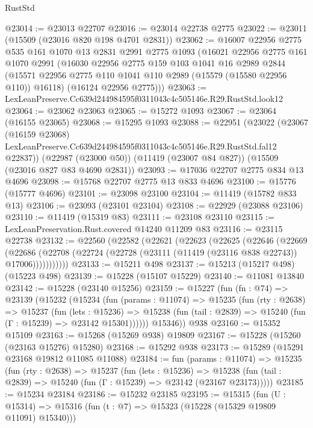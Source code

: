 \begin{lexlean}{RustStd}
\begin{coremodule}
@23014 := @23013 @22707
@23016 := @23014 @22738 @2775
@23022 := @23011 (@15509 (@23016 @820 @198 @4701 @2831))
@23062 := @16007
    @22956
    @2775
    @535
    @161
    @1070
    @13
    @2831
    @2991
    @2775
    @1093
    (@16021
      @22956
      @2775
      @161
      @1070
      @2991
      (@16030
        @22956
        @2775
        @159
        @103
        @1041
        @16
        @2989
        @2844
        (@15571 @22956 @2775 @110 @1041 @110 @2989 (@15579 (@15580 @22956 @110)) @16118)
        (@16124 @22956 @2775)))
@23063 := LexLeanPreserve.Cc639d244984595f0311043c4c505146e.R29.RustStd.look12
@23064 := @23062 @23063
@23065 := @15272 @1093
@23067 := @23064 (@16155 @23065)
@23068 := @15295 @1093
@23088 := @22951
    (@23022
      (@23067
        (@16159 @23068)
        LexLeanPreserve.Cc639d244984595f0311043c4c505146e.R29.RustStd.fal12
        @22837))
    (@22987 (@23000 @50))
    (@11419 (@23007 @84 @827))
    (@15509 (@23016 @827 @83 @4690 @2831))
@23093 := @17036 @22707 @2775 @834 @13 @4696
@23098 := @15768 @22707 @2775 @13 @833 @4696
@23100 := @15776 (@15777 @4696)
@23101 := @23098 @23100
@23104 := @11419 (@15782 @833 @13)
@23106 := @23093 (@23101 @23104)
@23108 := @22929 (@23088 @23106)
@23110 := @11419 (@15319 @83)
@23111 := @23108 @23110
@23115 := LexLeanPreservation.Rust.covered @14240 @11209 @83
@23116 := @23115 @22738
@23132 := @22560
    (@22582
      (@22621
        (@22623
          (@22625
            (@22646
              (@22669
                (@22686
                  (@22708 (@22724 (@22728 (@23111 (@11419 (@23116 @838 @22743)) @17006)))))))))))
@23133 := @15211 @498
@23137 := @15213 (@15217 @498) (@15223 @498)
@23139 := @15228 (@15107 @15229)
@23140 := @11081 @13840
@23142 := @15228 (@23140 @15256)
@23159 := @15227
    (fun (fn : @74) =>
    @23139
      (@15232
        (@15234
          (fun (params : @11074) =>
          @15235
            (fun (rty : @2638) =>
            @15237
              (fun (lets : @15236) =>
              @15238 (fun (tail : @2839) => @15240 (fun (Γ : @15239) => @23142 @15301))))))
        @15346))
    @938
@23160 := @15352 @15109
@23163 := @15268 (@15269 @938) @19809
@23167 := @15228 (@15260 (@23163 @15276) @15280)
@23168 := @15292 @938
@23173 := @15289 (@15291 @23168 @19812 @11085 @11088)
@23184 := fun (params : @11074) =>
  @15235
    (fun (rty : @2638) =>
    @15237
      (fun (lets : @15236) =>
      @15238 (fun (tail : @2839) => @15240 (fun (Γ : @15239) => @23142 (@23167 @23173)))))
@23185 := @15234 @23184
@23186 := @15232 @23185
@23195 := @15315
    (fun (U : @15314) => @15316 (fun (t : @7) => @15323 (@15228 (@15329 @19809 @11091) @15340)))

\end{coremodule}
\end{lexlean}
